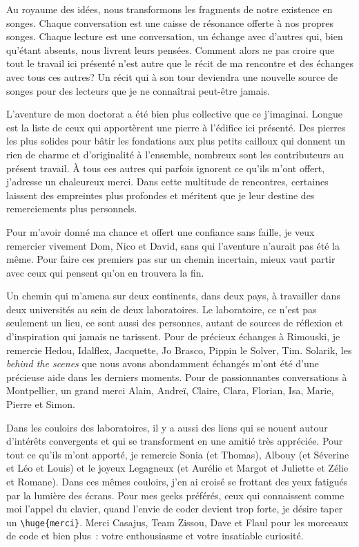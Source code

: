 Au royaume des idées, nous transformons les fragments de notre existence
en songes. Chaque conversation est une caisse de résonance offerte à nos
propres songes. Chaque lecture est une conversation, un échange avec
d'autres qui, bien qu'étant absents, nous livrent leurs pensées. Comment
alors ne pas croire que tout le travail ici présenté n'est autre que le
récit de ma rencontre et des échanges avec tous ces autres? Un récit qui
à son tour deviendra une nouvelle source de songes pour des lecteurs que
je ne connaîtrai peut-être jamais.

L'aventure de mon doctorat a été bien plus collective que ce j'imaginai.
Longue est la liste de ceux qui apportèrent une pierre à l'édifice ici
présenté. Des pierres les plus solides pour bâtir les fondations aux
plus petits cailloux qui donnent un rien de charme et d'originalité à
l'ensemble, nombreux sont les contributeurs au présent travail. À tous
ces autres qui parfois ignorent ce qu'ils m'ont offert, j'adresse un
chaleureux merci. Dans cette multitude de rencontres, certaines laissent
des empreintes plus profondes et méritent que je leur destine des
remerciements plus personnels.

Pour m'avoir donné ma chance et offert une confiance sans faille, je
veux remercier vivement Dom, Nico et David, sans qui l'aventure n'aurait
pas été la même. Pour faire ces premiers pas sur un chemin incertain,
mieux vaut partir avec ceux qui pensent qu'on en trouvera la fin.

Un chemin qui m'amena sur deux continents, dans deux pays, à travailler
dans deux universités au sein de deux laboratoires. Le laboratoire, ce
n'est pas seulement un lieu, ce sont aussi des personnes, autant de
sources de réflexion et d'inspiration qui jamais ne tarissent. Pour de
précieux échanges à Rimouski, je remercie Hedou, Idalflex, Jacquette, Jo
Brasco, Pippin le Solver, Tim. Solarik, les \emph{behind the scenes} que
nous avons abondamment échangés m'ont été d'une précieuse aide dans les
derniers moments. Pour de passionnantes conversations à Montpellier, un
grand merci Alain, Andreï, Claire, Clara, Florian, Isa, Marie, Pierre et
Simon.

Dans les couloirs des laboratoires, il y a aussi des liens qui se nouent
autour d'intérêts convergents et qui se transforment en une amitié très
appréciée. Pour tout ce qu'ils m'ont apporté, je remercie Sonia (et
Thomas), Albouy (et Séverine et Léo et Louis) et le joyeux Legagneux (et
Aurélie et Margot et Juliette et Zélie et Romane). Dans ces mêmes
couloirs, j'en ai croisé se frottant des yeux fatigués par la lumière
des écrans. Pour mes geeks préférés, ceux qui connaissent comme moi
l'appel du clavier, quand l'envie de coder devient trop forte, je désire
taper un \texttt{\textbackslash{}huge\{merci\}}. Merci Casajus, Team
Zissou, Dave et Flaul pour les morceaux de code et bien plus~: votre
enthousiasme et votre insatiable curiosité.

